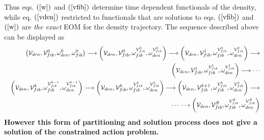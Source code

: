 Thus eqs. $\left( \ref{w}\right) $ and $\left( \ref{vfib}\right) $ determine
time dependent functionals of the density, while eq. $\left( \ref{vden}%
\right) $ restricted to functionals that are solutions to eqs. $\left( \ref%
{vfib}\right) $ and $\left( \ref{w}\right) $ are {\em the exact }EOM for the
density trajectory. The sequence described above can be displayed as 
\begin{eqnarray}
&&\left( {\cal V}_{den},{\cal V}_{fib}^{0},\omega _{den}^{0},\omega
_{fib}^{0}\right) \longrightarrow \left( {\cal V}_{den},{\cal V}_{fib}^{0},%
{\cal \omega }_{fib}^{{\cal V}_{fib}^{0}},\omega _{den}^{{\cal V}%
_{fib}^{0}}\right) \longrightarrow \left( {\cal V}_{den},{\cal V}_{fib}^{1},%
{\cal \omega }_{fib}^{{\cal V}_{fib}^{0}},\omega _{den}^{{\cal V}%
_{fib}^{0}}\right) \longrightarrow  \nonumber \\
&&\left( {\cal V}_{den},{\cal V}_{fib}^{1},{\cal \omega }_{fib}^{{\cal V}%
_{fib}^{1}},\omega _{den}^{{\cal V}_{fib}^{1}}\right) \longrightarrow \cdots
\nonumber \\
&&\left( {\cal V}_{den},{\cal V}_{fib}^{k},{\cal \omega }_{fib}^{{\cal V}%
_{fib}^{k-1}},\omega _{den}^{{\cal V}_{fib}^{k-1}}\right) \longrightarrow
\left( {\cal V}_{den},{\cal V}_{fib}^{k},{\cal \omega }_{fib}^{{\cal V}%
_{fib}^{k}},\omega _{den}^{{\cal V}_{fib}^{k}}\right) \longrightarrow \left( 
{\cal V}_{den},{\cal V}_{fib}^{k+1},{\cal \omega }_{fib}^{{\cal V}%
_{fib}^{k}},\omega _{den}^{{\cal V}_{fib}^{k}}\right) \longrightarrow 
\nonumber \\
&&\left. {}\right. \qquad \qquad \qquad \qquad \qquad \qquad \qquad \qquad
\qquad \qquad \qquad \cdots \longrightarrow \left( {\cal V}_{den},{\cal V}%
_{fib}^{\#},{\cal \omega }_{fib}^{{\cal V}_{fib}^{\#}},\omega _{den}^{{\cal V%
}_{fib}^{\#}}\right)
\end{eqnarray}%
{\bf However this form of partitioning and solution process does not give a
solution of the constrained action problem. }
